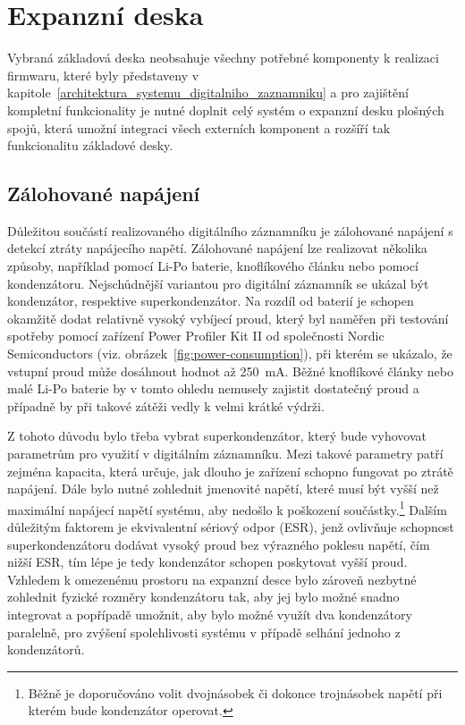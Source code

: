 


\section{Expanzní deska}
Vybraná základová deska neobsahuje všechny potřebné komponenty k realizaci firmwaru, které byly představeny v kapitole~\ref{architektura_systemu_digitalniho_zaznamniku} a pro zajištění kompletní funkcionality je nutné doplnit celý systém o expanzní desku plošných spojů, která umožní integraci všech externích komponent a rozšíří tak funkcionalitu základové desky.

\subsection{Zálohované napájení}
\label{zalohovane_napajeni_hw}
Důležitou součástí realizovaného digitálního záznamníku je zálohované napájení s detekcí ztráty napájecího napětí. Zálohované napájení lze realizovat několika způsoby, například pomocí Li-Po baterie, knoflíkového článku nebo pomocí kondenzátoru. Nejschůdnější variantou pro digitální záznamník se ukázal být kondenzátor, respektive superkondenzátor. Na rozdíl od baterií je schopen okamžitě dodat relativně vysoký vybíjecí proud, který byl naměřen při testování spotřeby pomocí zařízení Power Profiler Kit II od společnosti Nordic Semiconductors (viz. obrázek~\ref{fig:power-consumption}), při kterém se ukázalo, že vstupní proud může dosáhnout hodnot až \SI{250}{\milli\ampere}. Běžné knoflíkové články nebo malé Li-Po baterie by v tomto ohledu nemusely zajistit dostatečný proud a případně by při takové zátěži vedly k velmi krátké výdrži. \cite{nordic_semi_ppk2}

Z tohoto důvodu bylo třeba vybrat superkondenzátor, který bude vyhovovat parametrům pro využití v digitálním záznamníku. Mezi takové parametry patří zejména kapacita, která určuje, jak dlouho je zařízení schopno fungovat po ztrátě napájení. Dále bylo nutné zohlednit jmenovité napětí, které musí být vyšší než maximální napájecí napětí systému, aby nedošlo k poškození součástky.\footnote{Běžně je doporučováno volit dvojnásobek či dokonce trojnásobek napětí při kterém bude kondenzátor operovat.} Dalším důležitým faktorem je ekvivalentní sériový odpor (ESR), jenž ovlivňuje schopnost superkondenzátoru dodávat vysoký proud bez výrazného poklesu napětí, čím nižší ESR, tím lépe je tedy kondenzátor schopen poskytovat vyšší proud. Vzhledem k omezenému prostoru na expanzní desce bylo zároveň nezbytné zohlednit fyzické rozměry kondenzátoru tak, aby jej bylo možné snadno integrovat a popřípadě umožnit, aby bylo možné využít dva kondenzátory paralelně, pro zvýšení spolehlivosti systému v případě selhání jednoho z kondenzátorů. \cite{cadence_capacitor_size}

